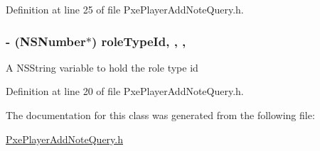 Definition at line 25 of file Pxe\-Player\-Add\-Note\-Query.\-h.

\hypertarget{interface_pxe_player_add_note_query_ae672dcec8caabe679146321fae6f7249}{
\subsubsection[{role\-Type\-Id}]{\setlength{\rightskip}{0pt plus 5cm}-\/ (N\-S\-Number$\ast$) role\-Type\-Id\hspace{0.3cm}{\ttfamily [read]}, {\ttfamily [write]}, {\ttfamily [nonatomic]}, {\ttfamily [strong]}}}\label{interface_pxe_player_add_note_query_ae672dcec8caabe679146321fae6f7249}
A N\-S\-String variable to hold the role type id 

Definition at line 20 of file Pxe\-Player\-Add\-Note\-Query.\-h.



The documentation for this class was generated from the following file\-:\begin{DoxyCompactItemize}
\item 
\hyperlink{_pxe_player_add_note_query_8h}{Pxe\-Player\-Add\-Note\-Query.\-h}\end{DoxyCompactItemize}
